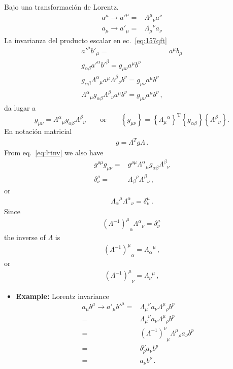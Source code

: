 Bajo una transformación de Lorentz.
\begin{align}
  a^\mu\to {a'}^\mu=&{\Lambda^\mu}_{\nu}a^\nu\\
  a_\mu\to {a'}_\mu=&{\Lambda_\mu}^{\nu}a_\nu\nonumber
\end{align}
La invarianza del producto escalar en ec.~\eqref{eq:157qft}
\begin{align}
  {a'}^\mu{b'}_\mu=&a^\mu b_\mu\nonumber\\
g_{\alpha\beta}{a'}^\alpha{b'}^\beta=g_{\mu\nu}a^\mu b^\nu\nonumber\\
g_{\alpha\beta}{\Lambda^\alpha}_\mu{a}^\mu{\Lambda^\beta}_\nu{b}^\nu=g_{\mu\nu}a^\mu b^\nu\nonumber\\
{\Lambda^\alpha}_\mu g_{\alpha\beta}{\Lambda^\beta}_\nu{a}^\mu{b}^\nu=g_{\mu\nu}a^\mu b^\nu\,,
\end{align}
da lugar a
\begin{equation}
  \label{eq:lrinv}
  g_{\mu\nu}={\Lambda^\alpha}_{\mu}g_{\alpha\beta}{\Lambda^\beta}_{\nu}\qquad\text{or}\qquad 
\left\{g_{\mu\nu}\right\}=\left\{{\Lambda_{\mu}}^{\alpha}\right\}^{\text{T}}\left\{g_{\alpha\beta}\right\}\left\{{\Lambda^\beta}_{\nu}\right\}.
\end{equation}
En notación matricial
\begin{align}
 g=\Lambda^T g \Lambda\,. 
\end{align}
From eq.~\eqref{eq:lrinv} we also have
\begin{align}
  g^{\rho\mu}g_{\mu\nu}=&g^{\rho\mu}{\Lambda^\alpha}_{\mu}g_{\alpha\beta}{\Lambda^\beta}_{\nu}\nonumber\\
  \delta^\rho_\nu=&{\Lambda_\beta}^\rho{\Lambda^\beta}_{\nu}\,,
\end{align}
or
\begin{align}
  {\Lambda_\alpha}^\mu{\Lambda^\alpha}_{\nu}=\delta^\mu_\nu\,.
\end{align}
Since
\begin{align}
  {\left(\Lambda^{-1}\right)^\mu}_\alpha{\Lambda^\alpha}_{\nu}=\delta^\mu_\nu\,
\end{align}
the inverse of $\Lambda$ is
\begin{align}
  {\left(\Lambda^{-1}\right)^\mu}_\alpha={\Lambda_\alpha}^\mu\,,
\end{align}
or
\begin{align}
\label{eq:lambdainv}
  {\left(\Lambda^{-1}\right)^\mu}_\nu={\Lambda_\nu}^\mu\,,
\end{align}
\begin{itemize}
\item \textbf{Example:} Lorentz invariance
  \begin{align}
    a_\mu b^\mu\to a'_\mu{b'}^\mu=&{\Lambda_\mu}^\nu a_\nu{\Lambda^\mu}_\rho b^p \nonumber\\
    =&{\Lambda_\mu}^\nu a_\nu{\Lambda^\mu}_\rho b^p \nonumber\\
    =&{\left(\Lambda^{-1}\right)^\nu}_\mu{\Lambda^\mu}_\rho a_\nu b^p \nonumber\\
    =&\delta^\nu_\rho a_\nu b^p \nonumber\\
    =&a_\nu b^\nu \nonumber\,.
  \end{align}

\end{itemize}
